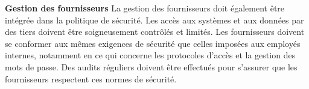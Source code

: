 \textbf{Gestion des fournisseurs}
La gestion des fournisseurs doit également être intégrée dans la politique de sécurité. Les accès aux systèmes et aux données par des tiers doivent être soigneusement contrôlés et limités. Les fournisseurs doivent se conformer aux mêmes exigences de sécurité que celles imposées aux employés internes, notamment en ce qui concerne les protocoles d'accès et la gestion des mots de passe. Des audits réguliers doivent être effectués pour s'assurer que les fournisseurs respectent ces normes de sécurité.

